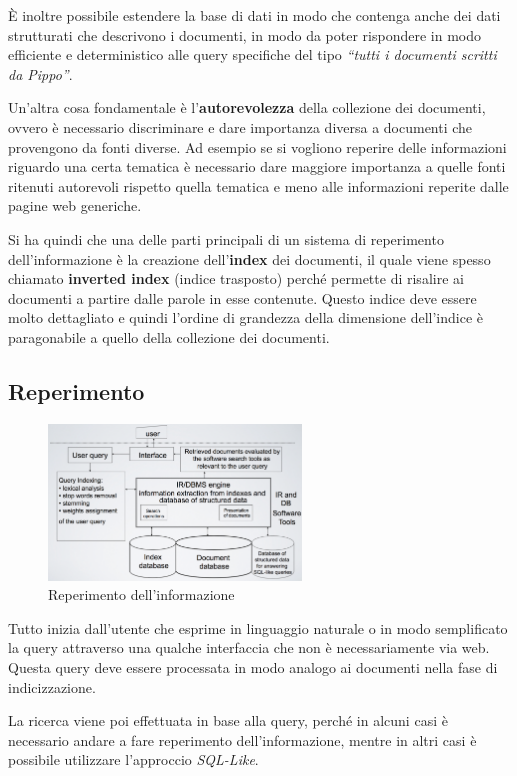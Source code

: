 \`E inoltre possibile estendere la base di dati in modo che contenga anche dei dati strutturati che descrivono i documenti, in modo da poter rispondere in modo efficiente e deterministico alle query specifiche del tipo \textit{``tutti i documenti scritti da Pippo''}.

Un'altra cosa fondamentale è l'\textbf{autorevolezza} della collezione dei documenti, ovvero è necessario discriminare e dare importanza diversa a documenti che provengono da fonti diverse. Ad esempio se si vogliono reperire delle informazioni riguardo una certa tematica è necessario dare maggiore importanza a quelle fonti ritenuti autorevoli rispetto quella tematica e meno alle informazioni reperite dalle pagine web generiche.

Si ha quindi che una delle parti principali di un sistema di reperimento dell'informazione è la creazione dell'\textbf{index} dei documenti, il quale viene spesso chiamato \textbf{inverted index} (indice trasposto) perché permette di risalire ai documenti a partire dalle parole in esse contenute. 
Questo indice deve essere molto dettagliato e quindi l'ordine di grandezza della dimensione dell'indice è paragonabile a quello della collezione dei documenti.

\subsection{Reperimento}

\begin{figure}
	\centering
	\includegraphics[width=0.6\textwidth]{images/l2-reperimento.png}
	\caption{Reperimento dell'informazione}
\end{figure}

Tutto inizia dall'utente che esprime in linguaggio naturale o in modo semplificato la query attraverso una qualche interfaccia che non è necessariamente via web. Questa query deve essere processata in modo analogo ai documenti nella fase di indicizzazione.

La ricerca viene poi effettuata in base alla query, perché in alcuni casi è necessario andare a fare reperimento dell'informazione, mentre in altri casi è possibile utilizzare l'approccio \textit{SQL-Like}.

